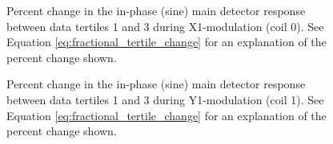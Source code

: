 \begin{figure}[h]

\centering
{}
\caption{Percent change in the in-phase (sine) main detector response between data tertiles 1 and 3 during X1-modulation (coil 0). See Equation \ref{eq:fractional_tertile_change} for an explanation of the percent change shown.}
\label{fig:tert_md_coeff_coil0}
\end{figure}
\begin{figure}[h]

\centering
{}
\caption{Percent change in the in-phase (sine) main detector response between data tertiles 1 and 3 during Y1-modulation (coil 1). See Equation \ref{eq:fractional_tertile_change} for an explanation of the percent change shown.}
\label{fig:tert_md_coeff_coil1}
\end{figure}
